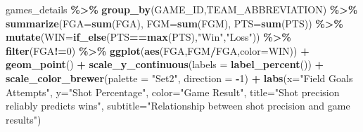 \documentclass[
  12pt,
  a4paper,
]{article}
\newenvironment{Shaded}{\begin{snugshade}}{\end{snugshade}}
\newcommand{\AttributeTok}[1]{\textcolor[rgb]{0.13,0.29,0.53}{#1}}
\newcommand{\DecValTok}[1]{\textcolor[rgb]{0.00,0.00,0.81}{#1}}
\newcommand{\FunctionTok}[1]{\textcolor[rgb]{0.13,0.29,0.53}{\textbf{#1}}}
\newcommand{\NormalTok}[1]{#1}
\newcommand{\SpecialCharTok}[1]{\textcolor[rgb]{0.81,0.36,0.00}{\textbf{#1}}}
\newcommand{\StringTok}[1]{\textcolor[rgb]{0.31,0.60,0.02}{#1}}
\begin{document}
\begin{Shaded}
\begin{Highlighting}[]
\NormalTok{games\_details }\SpecialCharTok{\%\textgreater{}\%}
  \FunctionTok{group\_by}\NormalTok{(GAME\_ID,TEAM\_ABBREVIATION) }\SpecialCharTok{\%\textgreater{}\%}
  \FunctionTok{summarize}\NormalTok{(}\AttributeTok{FGA=}\FunctionTok{sum}\NormalTok{(FGA), }\AttributeTok{FGM=}\FunctionTok{sum}\NormalTok{(FGM),}
            \AttributeTok{PTS=}\FunctionTok{sum}\NormalTok{(PTS)) }\SpecialCharTok{\%\textgreater{}\%}
  \FunctionTok{mutate}\NormalTok{(}\AttributeTok{WIN=}\FunctionTok{if\_else}\NormalTok{(PTS}\SpecialCharTok{==}\FunctionTok{max}\NormalTok{(PTS),}\StringTok{"Win"}\NormalTok{,}\StringTok{"Loss"}\NormalTok{)) }\SpecialCharTok{\%\textgreater{}\%}
  \FunctionTok{filter}\NormalTok{(FGA}\SpecialCharTok{!=}\DecValTok{0}\NormalTok{) }\SpecialCharTok{\%\textgreater{}\%}
  \FunctionTok{ggplot}\NormalTok{(}\FunctionTok{aes}\NormalTok{(FGA,FGM}\SpecialCharTok{/}\NormalTok{FGA,}\AttributeTok{color=}\NormalTok{WIN)) }\SpecialCharTok{+}
  \FunctionTok{geom\_point}\NormalTok{() }\SpecialCharTok{+}
  \FunctionTok{scale\_y\_continuous}\NormalTok{(}\AttributeTok{labels =} \FunctionTok{label\_percent}\NormalTok{()) }\SpecialCharTok{+}
  \FunctionTok{scale\_color\_brewer}\NormalTok{(}\AttributeTok{palette =} \StringTok{"Set2"}\NormalTok{, }\AttributeTok{direction =} \SpecialCharTok{{-}}\DecValTok{1}\NormalTok{) }\SpecialCharTok{+}
  \FunctionTok{labs}\NormalTok{(}\AttributeTok{x=}\StringTok{"Field Goals Attempts"}\NormalTok{, }\AttributeTok{y=}\StringTok{"Shot Percentage"}\NormalTok{,}
       \AttributeTok{color=}\StringTok{"Game Result"}\NormalTok{,}
       \AttributeTok{title=}\StringTok{"Shot precision reliably predicts wins"}\NormalTok{,}
       \AttributeTok{subtitle=}\StringTok{"Relationship between shot}
\StringTok{                 precision and game results"}\NormalTok{)}


\end{Highlighting}
\end{Shaded}
\end{document}
